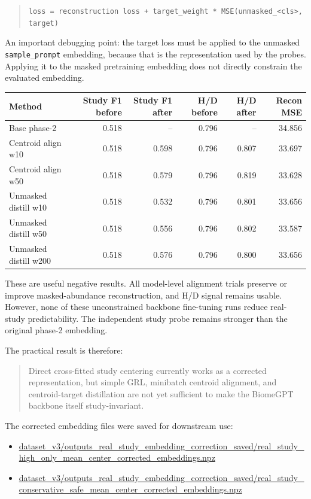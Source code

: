 \documentclass[11pt]{article}
\newcommand{\code}[1]{\texttt{\small #1}}
\newcommand{\filepath}[1]{\begingroup\urlstyle{tt}\small\url{#1}\endgroup}
\begin{document}
\begin{quote}
\code{loss = reconstruction loss + target\_weight * MSE(unmasked\_<cls>, target)}
\end{quote}

An important debugging point: the target loss must be applied to the unmasked
\code{sample\_prompt} embedding, because that is the representation used by the probes.
Applying it to the masked pretraining embedding does not directly constrain the evaluated
embedding.

\begin{center}
\begin{tabular}{lrrrrr}
\toprule
Method & Study F1 before & Study F1 after & H/D before & H/D after & Recon MSE \\
\midrule
Base phase-2 & 0.518 & -- & 0.796 & -- & 34.856 \\
Centroid align w10 & 0.518 & 0.598 & 0.796 & 0.807 & 33.697 \\
Centroid align w50 & 0.518 & 0.579 & 0.796 & 0.819 & 33.628 \\
Unmasked distill w10 & 0.518 & 0.532 & 0.796 & 0.801 & 33.656 \\
Unmasked distill w50 & 0.518 & 0.556 & 0.796 & 0.802 & 33.587 \\
Unmasked distill w200 & 0.518 & 0.576 & 0.796 & 0.800 & 33.656 \\
\bottomrule
\end{tabular}
\end{center}

These are useful negative results. All model-level alignment trials preserve or improve
masked-abundance reconstruction, and H/D signal remains usable. However, none of these
unconstrained backbone fine-tuning runs reduce real-study predictability. The independent
study probe remains stronger than the original phase-2 embedding.

The practical result is therefore:

\begin{quote}
Direct cross-fitted study centering currently works as a corrected representation, but
simple GRL, minibatch centroid alignment, and centroid-target distillation are not yet
sufficient to make the BiomeGPT backbone itself study-invariant.
\end{quote}

The corrected embedding files were saved for downstream use:

\begin{itemize}
  \item \filepath{dataset_v3/outputs_real_study_embedding_correction_saved/real_study_high_only_mean_center_corrected_embeddings.npz}
  \item \filepath{dataset_v3/outputs_real_study_embedding_correction_saved/real_study_conservative_safe_mean_center_corrected_embeddings.npz}
\end{itemize}
\end{document}
